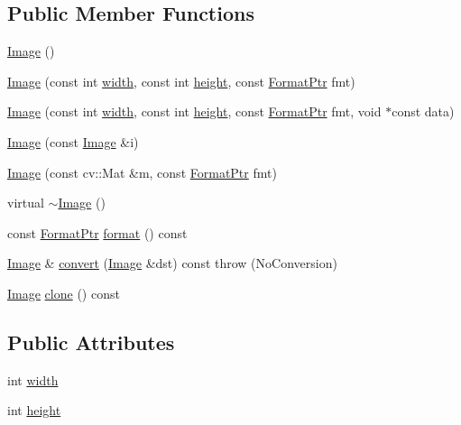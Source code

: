 \subsection*{Public Member Functions}
\begin{DoxyCompactItemize}
\item 
\hyperlink{classcolorspaces_1_1_image_ac5cf4664b2cd2c67bb83624c14d92b5f}{Image} ()
\item 
\hyperlink{classcolorspaces_1_1_image_a814ba81329dd867cc29ad784cb99e533}{Image} (const int \hyperlink{classcolorspaces_1_1_image_ab80af7d4797110c23ed575b329ec7c4f}{width}, const int \hyperlink{classcolorspaces_1_1_image_a99a05ebd37f61215b2c3042ecaefdbfc}{height}, const \hyperlink{classcolorspaces_1_1_image_ab3978cc7acc2b5e855f8c715f09667d1}{Format\+Ptr} fmt)
\item 
\hyperlink{classcolorspaces_1_1_image_ac2f208a6668b26a5db23c4c5a42b0b13}{Image} (const int \hyperlink{classcolorspaces_1_1_image_ab80af7d4797110c23ed575b329ec7c4f}{width}, const int \hyperlink{classcolorspaces_1_1_image_a99a05ebd37f61215b2c3042ecaefdbfc}{height}, const \hyperlink{classcolorspaces_1_1_image_ab3978cc7acc2b5e855f8c715f09667d1}{Format\+Ptr} fmt, void $\ast$const data)
\item 
\hyperlink{classcolorspaces_1_1_image_a1db9485ca9972ed04c2eef084bde5c42}{Image} (const \hyperlink{classcolorspaces_1_1_image}{Image} \&i)
\item 
\hyperlink{classcolorspaces_1_1_image_a1d662eee2751a2f4980efe083e6d8f32}{Image} (const cv\+::\+Mat \&m, const \hyperlink{classcolorspaces_1_1_image_ab3978cc7acc2b5e855f8c715f09667d1}{Format\+Ptr} fmt)
\item 
virtual \hyperlink{classcolorspaces_1_1_image_ad5463e8cae11b572cd10a92734216f8a}{$\sim$\+Image} ()
\item 
const \hyperlink{classcolorspaces_1_1_image_ab3978cc7acc2b5e855f8c715f09667d1}{Format\+Ptr} \hyperlink{classcolorspaces_1_1_image_a1bd416764e9349d73ab57154c0eebcc7}{format} () const
\item 
\hyperlink{classcolorspaces_1_1_image}{Image} \& \hyperlink{classcolorspaces_1_1_image_af33b3aeb1a668b64f3ae4e00b90058a5}{convert} (\hyperlink{classcolorspaces_1_1_image}{Image} \&dst) const  throw (\+No\+Conversion)
\item 
\hyperlink{classcolorspaces_1_1_image}{Image} \hyperlink{classcolorspaces_1_1_image_a1bf62f4371700005a8f9581b2f70f31f}{clone} () const
\end{DoxyCompactItemize}
\subsection*{Public Attributes}
\begin{DoxyCompactItemize}
\item 
int \hyperlink{classcolorspaces_1_1_image_ab80af7d4797110c23ed575b329ec7c4f}{width}
\item 
int \hyperlink{classcolorspaces_1_1_image_a99a05ebd37f61215b2c3042ecaefdbfc}{height}
\end{DoxyCompactItemize}
